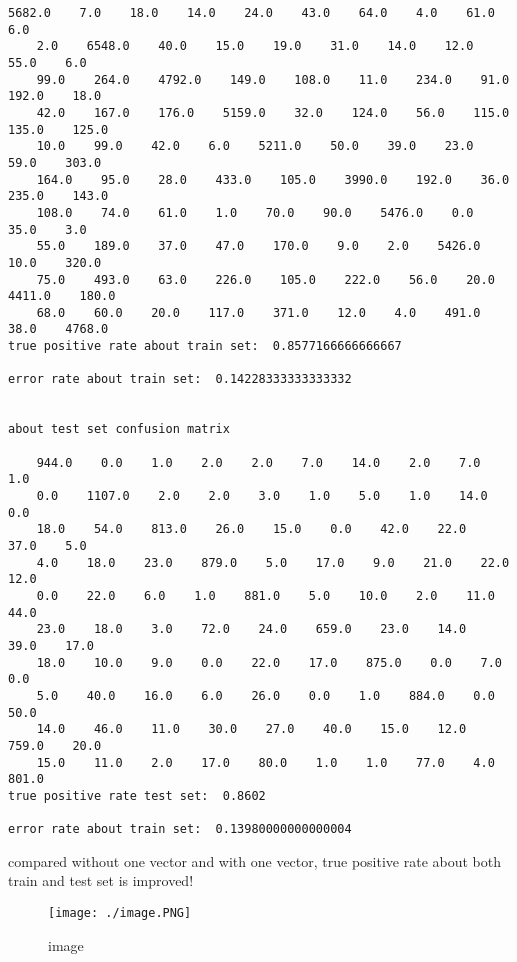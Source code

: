 \documentclass[11pt]{article}
\makeatletter
\def\maxwidth{\ifdim\Gin@nat@width>\linewidth\linewidth
    \else\Gin@nat@width\fi}
\let\Oldincludegraphics\includegraphics
\renewcommand{\includegraphics}[1]{\Oldincludegraphics[width=.8\maxwidth]{#1}}
\makeatother
\begin{document}
\begin{Verbatim}[commandchars=\\\{\}]
    5682.0    7.0    18.0    14.0    24.0    43.0    64.0    4.0    61.0    6.0
    2.0    6548.0    40.0    15.0    19.0    31.0    14.0    12.0    55.0    6.0
    99.0    264.0    4792.0    149.0    108.0    11.0    234.0    91.0    192.0    18.0
    42.0    167.0    176.0    5159.0    32.0    124.0    56.0    115.0    135.0    125.0
    10.0    99.0    42.0    6.0    5211.0    50.0    39.0    23.0    59.0    303.0
    164.0    95.0    28.0    433.0    105.0    3990.0    192.0    36.0    235.0    143.0
    108.0    74.0    61.0    1.0    70.0    90.0    5476.0    0.0    35.0    3.0
    55.0    189.0    37.0    47.0    170.0    9.0    2.0    5426.0    10.0    320.0
    75.0    493.0    63.0    226.0    105.0    222.0    56.0    20.0    4411.0    180.0
    68.0    60.0    20.0    117.0    371.0    12.0    4.0    491.0    38.0    4768.0
true positive rate about train set:  0.8577166666666667

error rate about train set:  0.14228333333333332


about test set confusion matrix

    944.0    0.0    1.0    2.0    2.0    7.0    14.0    2.0    7.0    1.0
    0.0    1107.0    2.0    2.0    3.0    1.0    5.0    1.0    14.0    0.0
    18.0    54.0    813.0    26.0    15.0    0.0    42.0    22.0    37.0    5.0
    4.0    18.0    23.0    879.0    5.0    17.0    9.0    21.0    22.0    12.0
    0.0    22.0    6.0    1.0    881.0    5.0    10.0    2.0    11.0    44.0
    23.0    18.0    3.0    72.0    24.0    659.0    23.0    14.0    39.0    17.0
    18.0    10.0    9.0    0.0    22.0    17.0    875.0    0.0    7.0    0.0
    5.0    40.0    16.0    6.0    26.0    0.0    1.0    884.0    0.0    50.0
    14.0    46.0    11.0    30.0    27.0    40.0    15.0    12.0    759.0    20.0
    15.0    11.0    2.0    17.0    80.0    1.0    1.0    77.0    4.0    801.0
true positive rate test set:  0.8602

error rate about train set:  0.13980000000000004

    \end{Verbatim}

    compared without one vector and with one vector, true positive rate
about both train and test set is improved!

\begin{figure}
\centering
\texttt{[image: ./image.PNG]}
\caption{image}
\end{figure}


    
    
    
    
\end{document}
